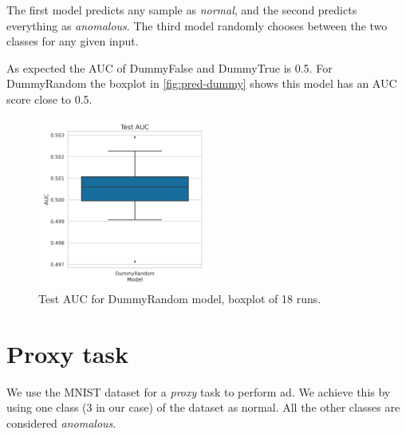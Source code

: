             The first model predicts any sample as \emph{normal}, and the second predicts everything as \emph{anomalous}. The third model randomly chooses between the two classes for any given input.
            
            As expected the AUC of DummyFalse and DummyTrue is 0.5. For DummyRandom the boxplot in \autoref{fig:pred-dummy} shows this model has an AUC score close to 0.5.
            
            \begin{figure}[H]
                \centering
                \centerline{\includegraphics[width=0.5\textwidth]{img/results/dummy.png}}
                \caption{Test AUC for DummyRandom model, boxplot of 18 runs.}
                \label{fig:pred-dummy}
            \end{figure}
            
        
        
    
    \section{Proxy task}
        We use the MNIST dataset for a \emph{proxy} task to perform \acrshort{ad}. We achieve this by using one class (3 in our case) of the dataset as normal. All the other classes are considered \emph{anomalous}.
        
